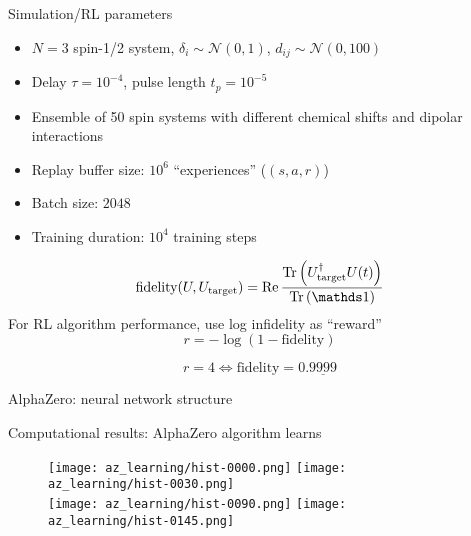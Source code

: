 \documentclass{beamer}
\begin{document}
\begin{frame}{Simulation/RL parameters}

\begin{itemize}
    \item $N=3$ spin-1/2 system, $\delta_i \sim \mathcal{N}(0, 1)$, $d_{ij} \sim \mathcal{N}(0, 100)$
    \item Delay $\tau = 10^{-4}$, pulse length $t_p = 10^{-5}$
    \item Ensemble of 50 spin systems with different chemical shifts and dipolar interactions
\end{itemize}


\begin{itemize}
    \item Replay buffer size: $10^6$ ``experiences'' ($(s, a, r)$)
    \item Batch size: $2048$
    \item Training duration: $10^4$ training steps
\end{itemize}

\[
    \text{fidelity}(U, U_\text{target}) = \Re{
        \frac{\Tr{U_\text{target}^\dagger U(t)}}{\Tr{\identity}}
    }
\]
For RL algorithm performance, use log infidelity as ``reward''
\[
    r = -\log \left( 1 - \text{fidelity} \right)
\]

\[
r = 4 \iff \text{fidelity} = 0.\underline{9999}
\]


\end{frame}

\begin{frame}{AlphaZero: neural network structure}

\begin{figure}
\centering
\scalebox{.6}{

}
\end{figure}

\end{frame}

\begin{frame}{Computational results: AlphaZero algorithm learns}

\begin{figure}
\centering
\texttt{[image: az\_learning/hist-0000.png]}
\texttt{[image: az\_learning/hist-0030.png]} \\
\texttt{[image: az\_learning/hist-0090.png]}
\texttt{[image: az\_learning/hist-0145.png]}
\end{figure}

\end{frame}
\end{document}
